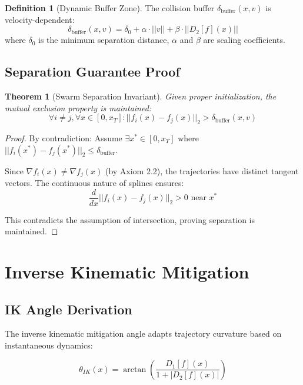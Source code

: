 \documentclass[11pt,a4paper]{article}
\theoremstyle{definition}
\newtheorem{definition}{Definition}[section]
\theoremstyle{plain}
\newtheorem{theorem}{Theorem}[section]
\newcommand{\dbuffer}{\delta_{\text{buffer}}}
\newcommand{\grad}{\nabla}
\begin{document}
\begin{definition}[Dynamic Buffer Zone]
The collision buffer $\dbuffer(x, v)$ is velocity-dependent:
\begin{equation}
\dbuffer(x, v) = \delta_0 + \alpha \cdot ||v|| + \beta \cdot ||D_2[f](x)||
\end{equation}
where $\delta_0$ is the minimum separation distance, $\alpha$ and $\beta$ are scaling coefficients.
\end{definition}

\subsection{Separation Guarantee Proof}

\begin{theorem}[Swarm Separation Invariant]
Given proper initialization, the mutual exclusion property is maintained:
\begin{equation}
\forall i \neq j, \forall x \in [0, x_T]: ||f_i(x) - f_j(x)||_2 > \dbuffer(x, v)
\end{equation}
\end{theorem}

\begin{proof}
By contradiction: Assume $\exists x^* \in [0, x_T]$ where $||f_i(x^*) - f_j(x^*)||_2 \leq \dbuffer$.

Since $\grad f_i(x) \neq \grad f_j(x)$ (by Axiom 2.2), the trajectories have distinct tangent vectors. The continuous nature of splines ensures:
\begin{equation}
\frac{d}{dx}||f_i(x) - f_j(x)||_2 > 0 \text{ near } x^*
\end{equation}

This contradicts the assumption of intersection, proving separation is maintained.
\end{proof}

\section{Inverse Kinematic Mitigation}

\subsection{IK Angle Derivation}

The inverse kinematic mitigation angle adapts trajectory curvature based on instantaneous dynamics:

\begin{equation}
\theta_{IK}(x) = \arctan\left(\frac{D_1[f](x)}{1 + |D_2[f](x)|}\right)
\end{equation}
\end{document}
